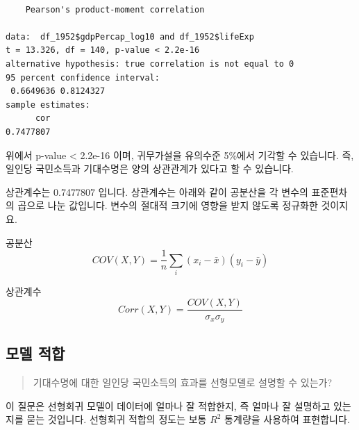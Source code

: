 \documentclass[
  letterpaper,
  DIV=11,
  numbers=noendperiod]{scrartcl}
\newenvironment{Shaded}{\begin{snugshade}}{\end{snugshade}}
\newcommand{\AttributeTok}[1]{\textcolor[rgb]{0.40,0.45,0.13}{#1}}
\newcommand{\DecValTok}[1]{\textcolor[rgb]{0.68,0.00,0.00}{#1}}
\newcommand{\FunctionTok}[1]{\textcolor[rgb]{0.28,0.35,0.67}{#1}}
\newcommand{\NormalTok}[1]{\textcolor[rgb]{0.00,0.23,0.31}{#1}}
\newcommand{\OtherTok}[1]{\textcolor[rgb]{0.00,0.23,0.31}{#1}}
\newcommand{\SpecialCharTok}[1]{\textcolor[rgb]{0.37,0.37,0.37}{#1}}
\begin{document}
\begin{Shaded}
\end{Shaded}

\begin{verbatim}

    Pearson's product-moment correlation

data:  df_1952$gdpPercap_log10 and df_1952$lifeExp
t = 13.326, df = 140, p-value < 2.2e-16
alternative hypothesis: true correlation is not equal to 0
95 percent confidence interval:
 0.6649636 0.8124327
sample estimates:
      cor 
0.7477807 
\end{verbatim}

위에서 p-value \textless{} 2.2e-16 이며, 귀무가설을 유의수준 5\%에서
기각할 수 있습니다. 즉, 일인당 국민소득과 기대수명은 양의 상관관계가
있다고 할 수 있습니다.

상관계수는 0.7477807 입니다. 상관계수는 아래와 같이 공분산을 각 변수의
표준편차의 곱으로 나눈 값입니다. 변수의 절대적 크기에 영향을 받지 않도록
정규화한 것이지요.

공분산\\
\[COV(X,Y)=\frac{1}{n}\sum_{i}(x_i-\bar{x})(y_i-\bar{y})\]

상관계수 \[Corr(X,Y)=\frac{COV(X,Y)}{\sigma_x\sigma_y}\]

\hypertarget{uxbaa8uxb378-uxc801uxd569}{%
\subsection{모델 적합}\label{uxbaa8uxb378-uxc801uxd569}}

\begin{quote}
기대수명에 대한 일인당 국민소득의 효과를 선형모델로 설명할 수 있는가?
\end{quote}

이 질문은 선형회귀 모델이 데이터에 얼마나 잘 적합한지, 즉 얼마나 잘
설명하고 있는지를 묻는 것입니다. 선형회귀 적합의 정도는 보통 \(R^2\)
통계량을 사용하여 표현합니다.
\end{document}
